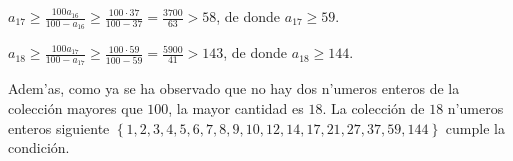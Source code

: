 {\ve

$a_{17}\geq \frac{100a_{16}}{100-a_{16}}\geq \frac{100\cdot 37}{100-37}=%
\frac{3700}{63}>58$, de donde  $a_{17}\geq 59$.

\ve

$a_{18}\geq \frac{100a_{17}}{100-a_{17}}\geq \frac{100\cdot 59}{100-59}=%
\frac{5900}{41}>143$, de donde  $a_{18}\geq 144$.

\ve

\noindent Adem'as, como ya se ha observado que no hay dos  
n'umeros enteros de la colecci\'{o}n mayores que $100$, 
la mayor cantidad es $18$.
La colecci\'{o}n de $18$ n'umeros enteros siguiente 
$\left\{ 1,2,3,4,5,6,7,8,9,10,12,14,17,21,27,37,59,144\right\}$ 
cumple la condici\'{o}n.
}










